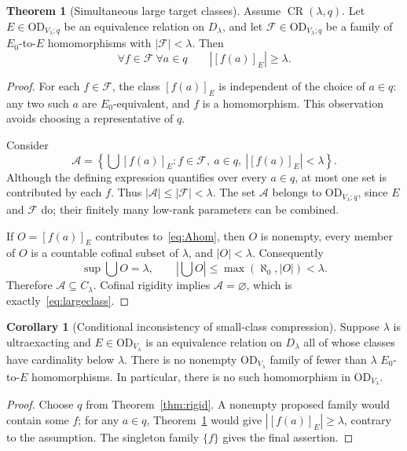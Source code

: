 \documentclass[11pt,letterpaper]{article}
\theoremstyle{definition}
\newtheorem{theorem}[definition]{Theorem}
\newtheorem{corollary}[definition]{Corollary}
\numberwithin{equation}{section}
\newcommand{\OD}{\mathrm{OD}}
\newcommand{\D}{D_\lambda}
\newcommand{\C}{C_\lambda}
\newcommand{\ODlow}{\OD_{V_\lambda}}
\newcommand{\ODq}{\OD_{V_\lambda;q}}
\newcommand{\Rig}{\operatorname{CR}}
\begin{document}
\begin{theorem}[Simultaneous large target classes]\label{thm:hom}
Assume $\Rig(\lambda,q)$. Let $E\in\ODq$ be an equivalence relation on $\D$, and let $\mathcal F\in\ODq$ be a family of $E_0$-to-$E$ homomorphisms with $|\mathcal F|<\lambda$. Then
\begin{equation}
\forall f\in\mathcal F\ \forall a\in q\qquad |[f(a)]_E|\ge\lambda.
\label{eq:largeclass}
\end{equation}
\end{theorem}
\begin{proof}
For each $f\in\mathcal F$, the class $[f(a)]_E$ is independent of the choice of $a\in q$: any two such $a$ are $E_0$-equivalent, and $f$ is a homomorphism. This observation avoids choosing a representative of $q$.

Consider
\begin{equation}
\mathcal A=
\left\{\bigcup[f(a)]_E:
 f\in\mathcal F,\ a\in q,\ |[f(a)]_E|<\lambda\right\}.
\label{eq:Ahom}
\end{equation}
Although the defining expression quantifies over every $a\in q$, at most one set is contributed by each $f$. Thus $|\mathcal A|\le|\mathcal F|<\lambda$. The set $\mathcal A$ belongs to $\ODq$, since $E$ and $\mathcal F$ do; their finitely many low-rank parameters can be combined.

If $O=[f(a)]_E$ contributes to~\eqref{eq:Ahom}, then $O$ is nonempty, every member of $O$ is a countable cofinal subset of $\lambda$, and $|O|<\lambda$. Consequently
\[
\sup\bigcup O=\lambda,
\qquad
\left|\bigcup O\right|\le\max(\aleph_0,|O|)<\lambda.
\]
Therefore $\mathcal A\subseteq\C$. Cofinal rigidity implies $\mathcal A=\varnothing$, which is exactly~\eqref{eq:largeclass}.
\end{proof}

\begin{corollary}[Conditional inconsistency of small-class compression]\label{cor:compression}
Suppose $\lambda$ is ultraexacting and $E\in\ODlow$ is an equivalence relation on $\D$ all of whose classes have cardinality below $\lambda$. There is no nonempty $\ODlow$ family of fewer than $\lambda$ $E_0$-to-$E$ homomorphisms. In particular, there is no such homomorphism in $\ODlow$.
\end{corollary}
\begin{proof}
Choose $q$ from Theorem~\ref{thm:rigid}. A nonempty proposed family would contain some $f$; for any $a\in q$, Theorem~\ref{thm:hom} would give $|[f(a)]_E|\ge\lambda$, contrary to the assumption. The singleton family $\{f\}$ gives the final assertion.
\end{proof}
\end{document}
